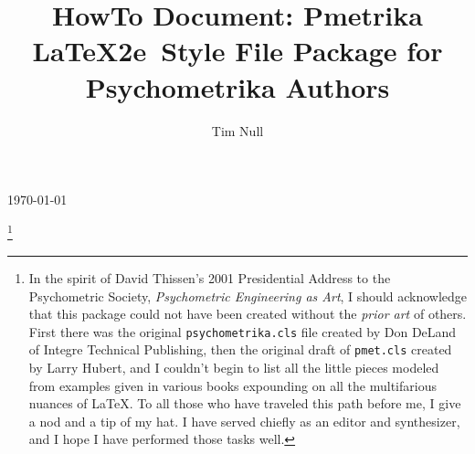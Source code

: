 \documentclass[titlepage,12pt]{article}
\begin{document}
\begin{titlepage}

\title{HowTo Document: Pmetrika \LaTeX2e\ Style File Package for Psychometrika Authors}




\author{Tim Null}





\vspace{36pt}\centerline{\today}\vspace{84pt}\longpage





\thanks{In the spirit of David Thissen's 2001 Presidential Address to the
Psychometric Society, \textit{Psychometric Engineering as Art}, I
should acknowledge that this package could not have been created
without the \textit{prior art} of others. First there was the
original \texttt{psychometrika.cls} file created by Don DeLand of
Integre Technical Publishing, then the original draft of
\texttt{pmet.cls} created by Larry Hubert, and I couldn't begin to
list all the little pieces modeled from examples given in various
books expounding on all the multifarious nuances of \LaTeX. To all
those who have traveled this path before me, I give a nod and a
tip of my hat. I have served chiefly as an editor and synthesizer,
and I hope I have performed those tasks well.}


\end{titlepage}

\setcounter{page}{2}
\vspace*{2\baselineskip}

\vskip6pt
\end{document}
